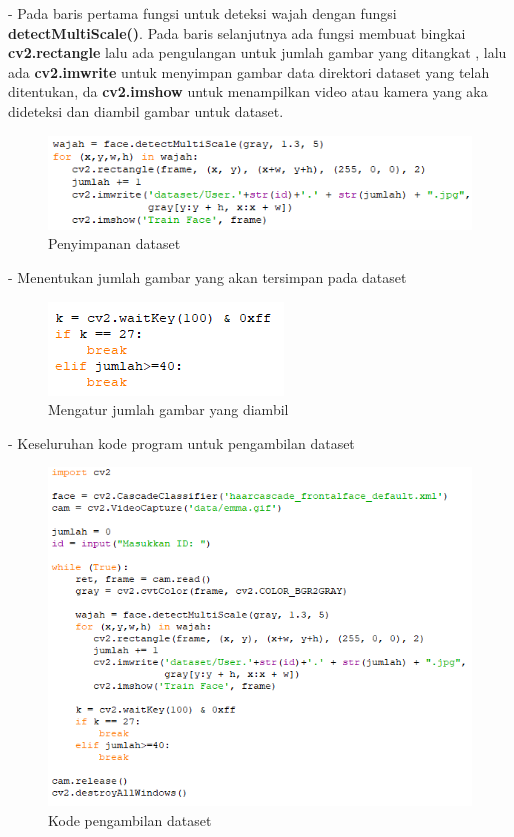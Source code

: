 \begin{enumerate}[1.]
- Pada baris pertama fungsi untuk deteksi wajah dengan fungsi \textbf{detectMultiScale()}. 
Pada baris selanjutnya ada fungsi membuat bingkai \textbf{cv2.rectangle} lalu ada pengulangan untuk jumlah gambar yang ditangkat
, lalu ada \textbf{cv2.imwrite} untuk menyimpan gambar data direktori dataset yang telah ditentukan, da \textbf{cv2.imshow} untuk 
menampilkan video atau kamera yang aka dideteksi dan diambil gambar untuk dataset.
\begin{figure}[h!]
    \centering
    \includegraphics[width=0.85\linewidth]{images/fr_5.PNG}
    \caption{Penyimpanan dataset}
\end{figure}

- Menentukan jumlah gambar yang akan tersimpan pada dataset
\begin{figure}[h!]
    \centering
    \includegraphics[width=0.5\linewidth]{images/fr_6.PNG}
    \caption{Mengatur jumlah gambar yang diambil}
\end{figure}
\newpage
- Keseluruhan kode program untuk pengambilan dataset
\begin{figure}[h!]
    \centering
    \includegraphics[width=0.85\linewidth]{images/fr_full.PNG}
    \caption{Kode pengambilan dataset}
\end{figure}


\end{enumerate}
